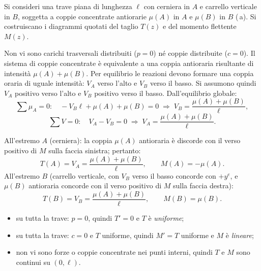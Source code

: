 \begin{esempio}
	Si consideri una trave piana di lunghezza $\ell$
	con cerniera in $A$ e carrello verticale in $B$,
	soggetta a coppie concentrate antiorarie
	$\mu(A)$ in $A$ e $\mu(B)$ in $B$ (\,a).
	Si costruiscano i diagrammi quotati del taglio $T(z)$
	e del momento flettente $M(z)$.
	
	\begin{svolgimento}
		



		

		
		Non vi sono carichi trasversali distribuiti
		($p = 0$) né coppie distribuite ($c = 0$).
		Il sistema di coppie concentrate è equivalente
		a una coppia antioraria risultante di intensità
		$\mu(A) + \mu(B)$. Per equilibrio le reazioni
		devono formare una coppia oraria di uguale
		intensità: $V_A$ verso l'alto e $V_B$ verso
		il basso.
		Si assumono quindi $V_A$ positivo verso l'alto
		e $V_B$ positivo verso il basso.
		Dall'equilibrio globale:
		\[
		\sum \mu_A = 0:\quad
		-V_B\ell + \mu(A) + \mu(B) = 0
		\;\Rightarrow\;
		V_B = \frac{\mu(A) + \mu(B)}{\ell},
		\]
		\[
		\sum V = 0:\quad
		V_A - V_B = 0
		\;\Rightarrow\;
		V_A = \frac{\mu(A) + \mu(B)}{\ell}.
		\]
		
		All'estremo $A$ (cerniera): la coppia $\mu(A)$
		antioraria è discorde con il verso positivo di
		$M$ sulla faccia sinistra; pertanto:
		\[
		T(A) = V_A = \frac{\mu(A)+\mu(B)}{\ell},
		\qquad
		M(A) = -\mu(A).
		\]
		All'estremo $B$ (carrello verticale, con $V_B$
		verso il basso concorde con $+y^e$, e $\mu(B)$
		antioraria concorde con il verso positivo di $M$
		sulla faccia destra):
		\[
		T(B) = V_B = \frac{\mu(A)+\mu(B)}{\ell},
		\qquad
		M(B) = \mu(B).
		\]
		
		\begin{itemize}[nosep]
			\item su tutta la trave: $p = 0$, quindi
			$T' = 0$ e $T$ è \emph{uniforme};
			\item su tutta la trave: $c = 0$ e $T$
			uniforme, quindi $M' = T$ uniforme
			e $M$ è \emph{lineare};
			\item non vi sono forze o coppie concentrate
			nei punti interni, quindi $T$ e $M$
			sono continui su $(0,\ell)$.
		\end{itemize}
		

\end{svolgimento}
\end{esempio}
